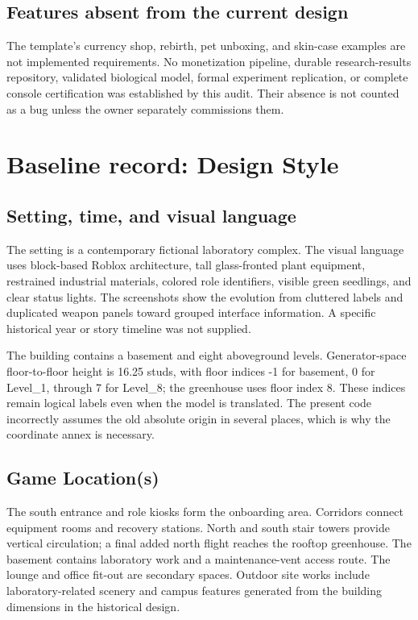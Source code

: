 \section{Features absent from the current design}
The template's currency shop, rebirth, pet unboxing, and skin-case examples are not implemented requirements.\allowbreak{} No monetization pipeline, durable research-results repository, validated biological model, formal experiment replication, or complete console certification was established by this audit.\allowbreak{} Their absence is not counted as a bug unless the owner separately commissions them.\allowbreak{}

\chapter{Baseline record: Design Style}
\section{Setting, time, and visual language}
The setting is a contemporary fictional laboratory complex.\allowbreak{} The visual language uses block-based Roblox architecture, tall glass-fronted plant equipment, restrained industrial materials, colored role identifiers, visible green seedlings, and clear status lights.\allowbreak{} The screenshots show the evolution from cluttered labels and duplicated weapon panels toward grouped interface information.\allowbreak{} A specific historical year or story timeline was not supplied.\allowbreak{}

The building contains a basement and eight aboveground levels.\allowbreak{} Generator-space floor-to-floor height is 16.\allowbreak{}25 studs, with floor indices -1 for basement, 0 for Level\_\allowbreak{}1, through 7 for Level\_\allowbreak{}8; the greenhouse uses floor index 8.\allowbreak{} These indices remain logical labels even when the model is translated.\allowbreak{} The present code incorrectly assumes the old absolute origin in several places, which is why the coordinate annex is necessary.\allowbreak{}

\section{Game Location(s)}
The south entrance and role kiosks form the onboarding area.\allowbreak{} Corridors connect equipment rooms and recovery stations.\allowbreak{} North and south stair towers provide vertical circulation; a final added north flight reaches the rooftop greenhouse.\allowbreak{} The basement contains laboratory work and a maintenance-vent access route.\allowbreak{} The lounge and office fit-out are secondary spaces.\allowbreak{} Outdoor site works include laboratory-related scenery and campus features generated from the building dimensions in the historical design.\allowbreak{}

